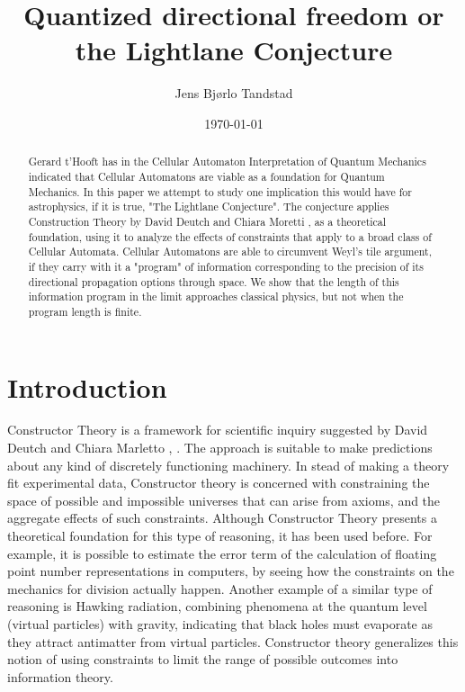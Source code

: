 \documentclass[notitlepage]{article}
\title{Quantized directional freedom or the Lightlane Conjecture}
\author{Jens Bjørlo Tandstad}
\date{\today}
\begin{document}
\maketitle
\thispagestyle{empty}
\begin{abstract}

Gerard t'Hooft has in the Cellular Automaton Interpretation of Quantum Mechanics \cite{hooft2014cellular} indicated that Cellular Automatons are viable as a foundation for Quantum Mechanics. In this paper we attempt to study one implication this would have for astrophysics, if it is true, "The Lightlane Conjecture". The conjecture applies Construction Theory by David Deutch and Chiara Moretti \cite{DeutchMoretti}, \cite{MorettiVedral} as a theoretical foundation, using it to analyze the effects of constraints that apply to a broad class of Cellular Automata. Cellular Automatons are able to circumvent Weyl's tile argument, if they carry with it a "program" of information corresponding to the precision of its directional propagation options through space. We show that the length of this information program in the limit approaches classical physics, but not when the program length is finite.
\end{abstract}

\section{Introduction}
Constructor Theory  is a framework for scientific inquiry suggested by David Deutch and Chiara Marletto \cite{DeutchMoretti}, \cite{MorettiVedral}. The approach is suitable to make predictions about any kind of discretely functioning machinery. In stead of making a theory fit experimental data, Constructor theory is concerned with constraining the space of possible and impossible universes that can arise from axioms, and the aggregate effects of such constraints. Although Constructor Theory presents a theoretical foundation for this type of reasoning, it has been used before. For example, it is possible to estimate the error term of the calculation of floating point number representations in computers, by seeing how the constraints on the mechanics for division actually happen. Another example of a similar type of reasoning is Hawking radiation, combining phenomena at the quantum level (virtual particles) with gravity, indicating that black holes must evaporate as they attract antimatter from virtual particles. Constructor theory generalizes this notion of using constraints to limit the range of possible outcomes into information theory.
\end{document}

